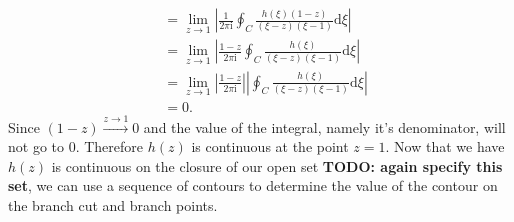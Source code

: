 \documentclass[10pt]{amsart}
\newcommand{\D}{\mathrm{d}}
\newcommand{\I}{\mathrm{i}}
\theoremstyle{nonumberplain}
\begin{document}
\begin{enumerate}[label={\bf {\arabic*}:}]
\begin{itemize}
\begin{align*}
	&= \lim_{z \rightarrow 1} \left| \frac 1 {2\pi \I} \oint_C \frac {h(\xi)(1 - z)}{(\xi - z)(\xi - 1)} \D \xi \right| \\
	&= \lim_{z \rightarrow 1} \left| \frac {1 - z} {2\pi \I} \oint_C \frac {h(\xi)}{(\xi - z)(\xi - 1)} \D \xi \right| \\
	&= \lim_{z \rightarrow 1} \left| \frac {1 - z} {2\pi \I} \right| \left|\oint_C \frac {h(\xi)}{(\xi - z)(\xi - 1)} \D \xi \right| \\
	&= 0.
\end{align*}
Since $(1-z)\overset{z \to 1}{\longrightarrow} 0$ and the value of the integral, namely it's denominator, will not go to 0.
Therefore $h(z)$ is continuous at the point $z = 1$.
Now that we have $h(z)$ is continuous on the closure of our open set \textbf{TODO: again specify this set}, we can use a sequence of contours to determine the value of the contour on the branch cut and branch points.

\end{itemize}
\newpage


\end{enumerate}
\end{document}
